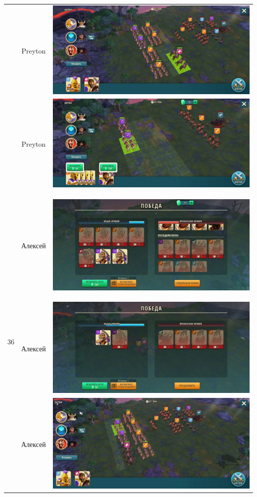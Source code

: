 \begin{longtable}{|c|c|c|}
	& Preyton &
	\includegraphics[width=0.75\linewidth]{./parts/media/TreasureHunt/36/Preyton/36.1.jpg} \\
	& Preyton &
	\includegraphics[width=0.75\linewidth]{./parts/media/TreasureHunt/36/Preyton/36.2.jpg} \\
	\hline
	\multirow{16}{*}{36} & Алексей &
	\hypertarget{fight36}{\includegraphics[width=0.75\linewidth]{./parts/media/TreasureHunt/36/alexey/photo_2022-04-15_11-02-44.jpg}} \\
	& Алексей &
	\includegraphics[width=0.75\linewidth]{./parts/media/TreasureHunt/36/alexey/photo_2022-04-15_11-02-55.jpg} \\
	& Алексей &
	\includegraphics[width=0.75\linewidth]{./parts/media/TreasureHunt/36/alexey/photo_2022-04-15_11-02-05.jpg} \\

\end{longtable}
